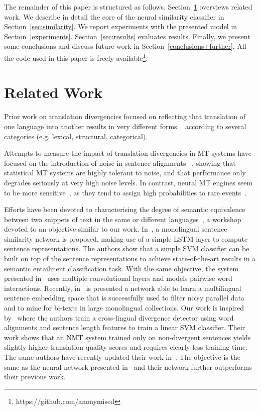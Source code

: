 \documentclass[11pt,a4paper]{article}
\begin{document}
The remainder of this paper is structured as follows. 
Section~\ref{related} overviews related work. 
We describe in detail the core of the neural similarity classifier in Section~\ref{sec:similarity}. 
We report experiments with the presented model in Section~\ref{experiments}.
Section~\ref{sec:results} evaluates results. 
Finally, we present some conclusions and discuss future work in
Section~\ref{conclusions+further}.
All the code used in this paper is freely
available\footnote{https://github.com/anonymised}.

\section{Related Work}
\label{related}

Prior work on translation divergencies focused on reflecting that translation of one language into another results in very different forms ~\cite{J94-4004} according to several categories (e.g. lexical, structural, categorical). 

Attempts to measure the impact of translation divergencies in MT systems have focused on the introduction of noise in sentence alignments ~\cite{goute2012}, showing that statistical MT systems are highly tolerant to noise, and that performance only degrades seriously at very high noise levels. 
In contrast, neural MT engines seem to be more sensitive~\cite{chen2016adaptation}, as they tend to assign high probabilities to rare events~\cite{Hassan2018AchievingHP}.

Efforts have been devoted to characterising the degree of semantic equivalence between two snippets of text in the same or different languages~\cite{conf/semeval/AgirreBCDGMRW16}, a workshop devoted to an objective similar to our work. 
In~\cite{Mueller:2016:SRA:3016100.3016291}, a monolingual sentence similarity network is proposed, making use of a simple LSTM layer to compute sentence representations. 
The authors show that a simple SVM classifier can be built on top of the sentence representations to achieve state-of-the-art results in a semantic entailment classification task. 
With the same objective, the system presented in~\cite{N16-1108} uses multiple convolutional layers and models pairwise word interactions. 
Recently, in~\cite{P18-2037} is presented a network able to learn a multilingual sentence embedding space that is successfully used to filter noisy parallel data and to mine for bi-texts in large monolingual collections.
Our work is inspired by~\cite{W17-3209} where the authors train a cross-lingual divergence detector using word alignments and sentence length features to train a linear SVM classifier. 
Their work shows that an NMT system trained only on non-divergent sentences yields slightly higher translation quality scores and requires clearly less training time. 
The same authors have recently updated their work in~\cite{DBLP:journals/corr/abs-1803-11112}. 
The objective is the same as the neural network presented in~\cite{N16-1108} and their network further outperforms their previous work. 
\end{document}
